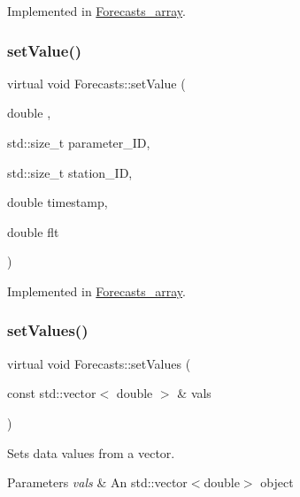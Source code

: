 Implemented in \mbox{\hyperlink{class_forecasts__array_a19d59c93e8b7692ebae2d3e15dc43f87}{Forecasts\+\_\+array}}.

\mbox{\label{class_forecasts_a584820dc47f1b5c4cae099485ee59cbe}} 
\subsubsection{\texorpdfstring{set\+Value()}{setValue()}\hspace{0.1cm}{\footnotesize\ttfamily [2/2]}}
{\footnotesize\ttfamily virtual void Forecasts\+::set\+Value (\begin{DoxyParamCaption}\item[{double}]{,  }\item[{std\+::size\+\_\+t}]{parameter\+\_\+\+ID,  }\item[{std\+::size\+\_\+t}]{station\+\_\+\+ID,  }\item[{double}]{timestamp,  }\item[{double}]{flt }\end{DoxyParamCaption})\hspace{0.3cm}{\ttfamily [pure virtual]}}



Implemented in \mbox{\hyperlink{class_forecasts__array_a7224d8333630fcd162a1b69b49241d2f}{Forecasts\+\_\+array}}.

\mbox{\label{class_forecasts_ae2a59385e03dd372fef3dfe89f5a31cf}} 
\subsubsection{\texorpdfstring{set\+Values()}{setValues()}}
{\footnotesize\ttfamily virtual void Forecasts\+::set\+Values (\begin{DoxyParamCaption}\item[{const std\+::vector$<$ double $>$ \&}]{vals }\end{DoxyParamCaption})\hspace{0.3cm}{\ttfamily [pure virtual]}}

Sets data values from a vector.


\begin{DoxyParams}{Parameters}
{\em vals} & An std\+::vector$<$double$>$ object \\
\hline
\end{DoxyParams}


